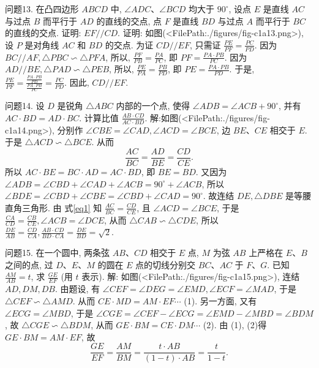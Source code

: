 问题13. 在凸四边形 $A B C D$ 中, $\angle A D C 、 \angle B C D$ 均大于 $90^{\circ}$, 设点 $E$ 是直线 $A C$ 与过点 $B$ 而平行于 $A D$ 的直线的交点, 点 $F$ 是直线 $B D$ 与过点 $A$ 而平行于 $B C$ 的直线的交点.
证明: $E F / / C D$.
证明: 如图(<FilePath:./figures/fig-c1a13.png>), 设 $P$ 是对角线 $A C$ 和 $B D$ 的交点.
为证 $C D / / E F$, 只需证 $\frac{P E}{P F}=\frac{P C}{P D}$. 因为 $B C / / A F, \triangle P B C \backsim \triangle P F A$, 所以, $\frac{P F}{P B}=\frac{P A}{P C}$, 即 $P F= \frac{P A \cdot P B}{P C}$. 因为 $A D / / B E, \triangle P A D \backsim \triangle P E B$, 所以, $\frac{P E}{P A}=\frac{P B}{P D}$, 即 $P E= \frac{P A \cdot P B}{P D}$. 于是, $\frac{P E}{P F}=\frac{\frac{P A \cdot P B}{P D}}{\frac{P A \cdot P B}{P C}}=\frac{P C}{P D}$. 因此, $C D / / E F$.



问题14. 设 $D$ 是锐角 $\triangle A B C$ 内部的一个点, 使得 $\angle A D B=\angle A C B+90^{\circ}$, 并有 $A C \cdot B D=A D \cdot B C$. 计算比值 $\frac{A B \cdot C D}{A C \cdot B D}$.
解:如图(<FilePath:./figures/fig-c1a14.png>), 分别作 $\angle C B E=\angle C A D, \angle A C D= \angle B C E$, 边 $B E 、 C E$ 相交于 $E$. 于是 $\triangle A C D \backsim \triangle B C E$. 从而
$$
\frac{A C}{B C}=\frac{A D}{B E}=\frac{C D}{C E} . \label{eq1}
$$
所以 $A C \cdot B E=B C \cdot A D=A C \cdot B D$, 即 $B E=B D$.
又因为 $\angle A D B=\angle C B D+\angle C A D+\angle A C B=90^{\circ}+\angle A C B$, 所以 $\angle B D E= \angle C B D+\angle C B E=\angle C B D+\angle C A D=90^{\circ}$. 故连结 $D E, \triangle D B E$ 是等腰直角三角形.
由 式\ref{eq1} 知 $\frac{A C}{B C}=\frac{C D}{C E}$, 且 $\angle A C D=\angle B C E$, 于是 $\frac{C A}{C D}=\frac{C B}{C E}, \angle A C B= \angle D C E$, 从而 $\triangle C A B \backsim \triangle C D E$, 所以 $\frac{D E}{A B}=\frac{C D}{C A}, \frac{A B \cdot C D}{B D \cdot C A}=\frac{D E}{B D}=\sqrt{2}$.



问题15. 在一个圆中, 两条弦 $A B 、 C D$ 相交于 $E$ 点, $M$ 为弦 $A B$ 上严格在 $E 、 B$ 之间的点, 过 $D 、 E 、 M$ 的圆在 $E$ 点的切线分别交 $B C 、 A C$ 于 $F 、 G$. 已知 $\frac{A M}{A B}=t$, 求 $\frac{G E}{E F}$ (用 $t$ 表示).
解: 如图(<FilePath:./figures/fig-c1a15.png>), 连结 $A D, D M, D B$. 由题设, 有 $\angle C E F=\angle D E G=\angle E M D, \angle E C F=\angle M A D$, 于是 $\triangle C E F \backsim \triangle A M D$.
从而 $C E \cdot M D=A M \cdot E F \cdots$ (1).
另一方面, 又有 $\angle E C G=\angle M B D$, 于是 $\angle C G E=\angle C E F-\angle E C G=\angle E M D-\angle M B D= \angle B D M$, 故 $\triangle C G E \backsim \triangle B D M$,
从而 $G E \cdot B M=C E \cdot D M \cdots$ (2).
由 (1), (2)得 $G E \cdot B M=A M \cdot E F$, 故
$$
\frac{G E}{E F}=\frac{A M}{B M}=\frac{t \cdot A B}{(1-t) \cdot A B}=\frac{t}{1-t} .
$$



